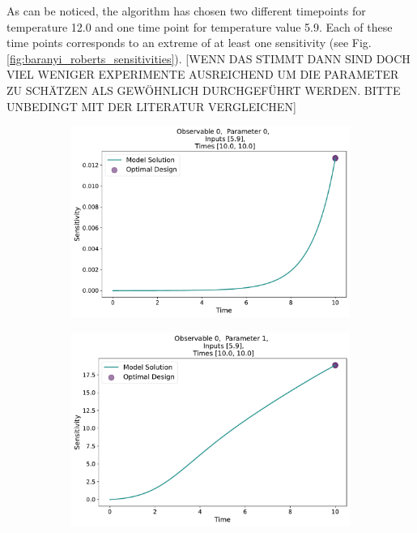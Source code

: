 \documentclass[10pt,A4paper]{article}
\begin{document}
As can be noticed, the algorithm has chosen two different timepoints for temperature 12.0 and  one time point for temperature value 5.9.
Each of these time points corresponds to an extreme of at least one sensitivity (see Fig. \ref{fig:baranyi_roberts_sensitivities}).
[WENN DAS STIMMT DANN SIND DOCH VIEL WENIGER EXPERIMENTE AUSREICHEND UM DIE PARAMETER ZU SCHÄTZEN ALS GEWÖHNLICH DURCHGEFÜHRT WERDEN. BITTE UNBEDINGT MIT DER LITERATUR VERGLEICHEN]
\begin{figure}[H]
    \begin{subfigure}{.5\textwidth}
      \centering
      \includegraphics[scale=0.27]{Figures/Sensitivity_Results_baranyi_roberts_ode_fisher_determinant_rel_sensit_cont_2times_2temps_000_x_00_p_00.pdf}
      \subcaption{}
    \end{subfigure}
    \begin{subfigure}{.5\textwidth}
      \centering
      \includegraphics[scale=0.27]{Figures/Sensitivity_Results_baranyi_roberts_ode_fisher_determinant_rel_sensit_cont_2times_2temps_000_x_00_p_01.pdf}

\end{subfigure}
\end{figure}
\end{document}
